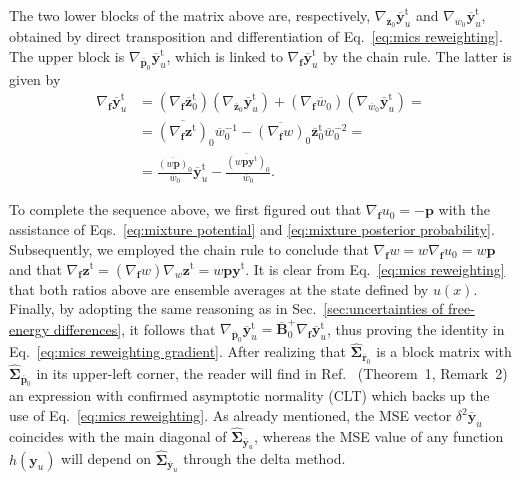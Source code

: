 \documentclass[journal=jctcce,manuscript=article,layout=twocolumn]{achemso}
\newcommand{\mt}[1]{\boldsymbol{\mathbf{#1}}}   %
\newcommand{\vt}[1]{\boldsymbol{\mathbf{#1}}}   %
\newcommand{\tr}[1]{#1^\text{t}}                %
\newcommand{\avg}[1]{\overline{#1}}             %
\begin{document}
The two lower blocks of the matrix above are, respectively, $\nabla_{\avg{\vt z}_0} \tr{\avg{\vt y}}_u$ and $\nabla_{\avg{w}_0} \tr{\avg{\vt y}}_u$, obtained by direct transposition and differentiation of Eq.~\eqref{eq:mics reweighting}. The upper block is $\nabla_{\avg{\vt p}_0} \tr{\avg{\vt y}}_u$, which is linked to $\nabla_{\vt f} \tr{\avg{\vt y}}_u$ by the chain rule. The latter is given by
\begin{equation*}
\begin{split}
\nabla_{\vt f} \tr{\avg{\vt y}}_u &= (\nabla_{\vt f} \tr{\avg{\vt z}}_0) (\nabla_{\avg{\vt z}_0} \tr{\avg{\vt y}}_u) + (\nabla_{\vt f} {\avg{w}_0}) (\nabla_{\avg{w}_0} \tr{\avg{\vt y}}_u) = \\
&= {{\avg{(\nabla_{\vt f} \tr{\vt z})}_0}}{\avg{w}_0^{-1}} - {\avg{(\nabla_{\vt f} w)}_0} \tr{\avg{\vt z}}_0  {\avg{w}_0^{-2}} = \\
&= \frac{\avg{(w {\vt p})}_0}{\avg{w}_0} \tr{\avg{\vt y}}_u - \frac{\avg{(w{\vt p}\tr{\vt y})}_0}{\avg{w}_0}.
\end{split}
\end{equation*}

To complete the sequence above, we first figured out that $\nabla_{\vt f} u_0 = -{\vt p}$ with the assistance of Eqs.~\eqref{eq:mixture potential} and \eqref{eq:mixture posterior probability}. Subsequently, we employed the chain rule to conclude that $\nabla_{\vt f} w = w \nabla_{\vt f} u_0 = w \vt p$ and that $\nabla_{\vt f} \tr{\vt z} = (\nabla_{\vt f} w) \nabla_w \tr{\vt z} = w \vt p \tr{\vt y}$. It is clear from Eq.~\eqref{eq:mics reweighting} that both ratios above are ensemble averages at the state defined by $u(x)$. Finally, by adopting the same reasoning as in Sec.~\ref{sec:uncertainties of free-energy differences}, it follows that $\nabla_{\avg{\vt p}_0} \tr{\avg{\vt y}}_u = \avg{\mt B}_0^+ \nabla_{\vt f} \tr{\avg{\vt y}}_u$, thus proving the identity in Eq.~\eqref{eq:mics reweighting gradient}. After realizing that $\hat{\mt \Sigma}_{\avg{\vt r}_0}$ is a block matrix with $\hat{\mt \Sigma}_{\avg{\vt p}_0}$ in its upper-left corner, the reader will find in Ref.~ (Theorem~1, Remark~2) an expression with confirmed asymptotic normality (CLT) which backs up the use of Eq.~\eqref{eq:mics reweighting}. As already mentioned, the MSE vector $\delta^2 \avg{\vt y}_u$ coincides with the main diagonal of $\hat{\mt \Sigma}_{\avg{\vt y}_u}$, whereas the MSE value of any function $h(\vt y_u)$ will depend on $\hat{\mt \Sigma}_{\avg{\vt y}_u}$ through the delta method.
\end{document}
